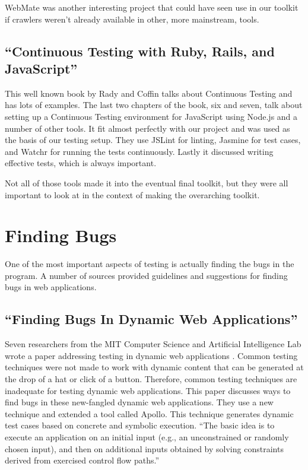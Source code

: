 \documentclass[12pt]{ucthesis}
\begin{document}
WebMate was another interesting project that could have seen use in our toolkit if crawlers weren't already available in other, more mainstream, tools.

\subsection{``Continuous Testing with Ruby, Rails, and JavaScript''}
This well known book by Rady and Coffin \cite{BookContinuousTesting} talks about Continuous Testing and has lots of examples. The last two chapters of the book, six and seven, talk about setting up a Continuous Testing environment for JavaScript using Node.js and a number of other tools. It fit almost perfectly with our project and was used as the basis of our testing setup. They use JSLint for linting, Jasmine for test cases, and Watchr for running the tests continuously. Lastly it discussed writing effective tests, which is always important.

Not all of those tools made it into the eventual final toolkit, but they were all important to look at in the context of making the overarching toolkit.

\section{Finding Bugs}
One of the most important aspects of testing is actually finding the bugs in the program. A number of sources provided guidelines and suggestions for finding bugs in web applications.

\subsection{``Finding Bugs In Dynamic Web Applications''}
Seven researchers from the MIT Computer Science and Artificial Intelligence Lab wrote a paper addressing testing in dynamic web applications \cite{FindingBugs}. Common testing techniques were not made to work with dynamic content that can be generated at the drop of a hat or click of a button. Therefore, common testing techniques are inadequate for testing dynamic web applications. This paper discusses ways to find bugs in these new-fangled dynamic web applications. They use a new technique and extended a tool called Apollo. This technique generates dynamic test cases based on concrete and symbolic execution. ``The basic idea is to execute an application on an initial input (e.g., an unconstrained or randomly chosen input), and then on additional inputs obtained by solving constraints derived from exercised control flow paths.''
\end{document}
